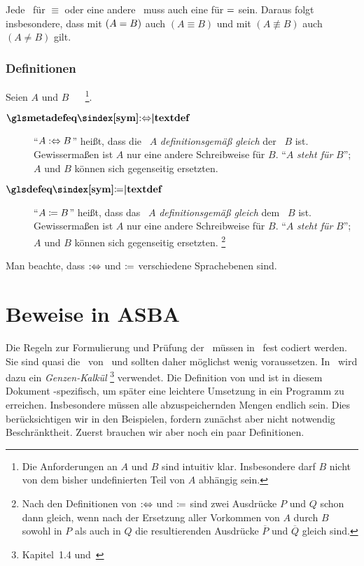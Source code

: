 Jede \interessierendeEigenschaft\ für $\equiv$ oder eine andere \Aequivalenz\ muss auch eine für $=$ sein.
Daraus folgt insbesondere, dass mit $(A = B)$ auch $(A \equiv B)$ und mit $(A \nequiv B)$ auch $(A \ne B)$ gilt.

\subsubsection{Definitionen}%
\label{subsub:Definitionen}

Seien $A$ und $B$ \Aussagen\ \textbzw\ \Objekte%
\footnote{%
	Die Anforderungen an $A$ und $B$ sind intuitiv klar.
	Insbesondere darf $B$ nicht von dem bisher undefinierten Teil von $A$ abhängig sein.
}.
\begin{description}
	\item[$\definition{\symmetadefeq}$]  \label{def:Metadefinition}
	\enquote{$A :\Leftrightarrow B$} heißt, dass die \Aussage\ $A$ \emph{definitionsgemäß gleich} der \Aussage\ $B$ ist.
	Gewissermaßen ist $A$ nur eine andere Schreibweise für $B$.
	\enquote{$A$ \emph{steht für} $B$}; $A$ und $B$ können sich gegenseitig ersetzten.
	\item[$\definition{\symdefeq}$]  \label{def:Definition}
	\enquote{$A \coloneqq B$} heißt, dass das \Objekt\ $A$ \emph{definitionsgemäß gleich} dem \Objekt\ $B$ ist.
	Gewissermaßen ist $A$ nur eine andere Schreibweise für $B$.
	\enquote{$A$ \emph{steht für} $B$}; $A$ und $B$ können sich gegenseitig ersetzten.%
	\footnote{%
		Nach den Definitionen von $:\Leftrightarrow$ und $\coloneqq$ sind zwei Ausdrücke $P$ und $Q$ schon dann gleich, wenn nach der Ersetzung aller Vorkommen von $A$ durch $B$ sowohl in $P$ als auch in $Q$ die resultierenden Ausdrücke $\overline{P}$ und $\overline{Q}$ gleich sind.
	}
\end{description}
Man beachte, dass $:\Leftrightarrow$ und $\coloneqq$ verschiedene Sprachebenen sind.

\section{Beweise in ASBA}%
\label{sec:BeweiseASBA}

Die Regeln zur Formulierung und Prüfung der \Beweise\ müssen in \ASBA\ fest codiert werden.
Sie sind quasi die \Axiome\ von \ASBA\ und sollten daher möglichst wenig voraussetzen.
In \ASBA\ wird dazu ein \emph{Genzen-Kalkül}%
\footnote{%
	 Kapitel~1.4 und~\cite{bib:Schlussregel,bib:NatuerlichesSchliessen}
} verwendet.
Die Definition von \emph{\Schlussregel} und \emph{\Beweis} ist in diesem Dokument \ASBA-spezifisch, um später eine leichtere Umsetzung in ein Programm zu erreichen.
Insbesondere müssen alle abzuspeichernden Mengen endlich sein.
Dies berücksichtigen wir in den Beispielen, fordern zunächst aber nicht notwendig Beschränktheit.
Zuerst brauchen wir aber noch ein paar Definitionen.

